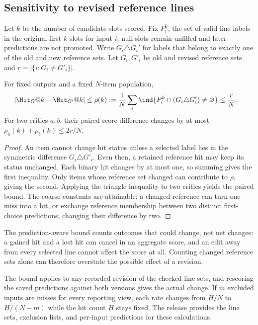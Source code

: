 \subsection{Sensitivity to revised reference lines}
Let $k$ be the number of candidate slots scored. Fix $P_i^k$, the set of valid line labels in the original first $k$ slots for input $i$; null slots remain unfilled and later predictions are not promoted. Write $G_i\triangle G_i' $ for labels that belong to exactly one of the old and new reference sets. Let $G_i,G'_i$ be old and revised reference sets and $r=|\{i:G_i\ne G'_i\}|$.
\begin{proposition}
\label{prop:perturb}
For fixed outputs and a fixed $N$-item population,
\begin{align}
\left|\Hit_G@k-\Hit_{G'}@k\right|
&\le \rho(k):=\frac1N\sum_i
\ind\{P_i^k\cap(G_i\triangle G'_i)\ne\varnothing\}
\le\frac rN.
\label{eq:prediction-aware-revision}
\end{align}
For two critics $a,b$, their paired score difference changes by at most $\rho_a(k)+\rho_b(k)\le2r/N$.
\end{proposition}
\begin{proof}
An item cannot change hit status unless a selected label lies in the symmetric difference $G_i\triangle G'_i$. Even then, a retained reference hit may keep its status unchanged. Each binary hit changes by at most one, so summing gives the first inequality. Only items whose reference set changed can contribute to $\rho$, giving the second. Applying the triangle inequality to two critics yields the paired bound. The coarse constants are attainable: a changed reference can turn one miss into a hit, or exchange reference membership between two distinct first-choice predictions, changing their difference by two.
\end{proof}
The prediction-aware bound counts outcomes that could change, not net changes: a gained hit and a lost hit can cancel in an aggregate score, and an edit away from every selected line cannot affect the score at all. Counting changed reference sets alone can therefore overstate the possible effect of a revision.

The bound applies to any recorded revision of the checked line sets, and rescoring the saved predictions against both versions gives the actual change. If $m$ excluded inputs are misses for every reporting view, each rate changes from $H/N$ to $H/(N-m)$ while the hit count $H$ stays fixed. The release provides the line sets, exclusion lists, and per-input predictions for these calculations.

